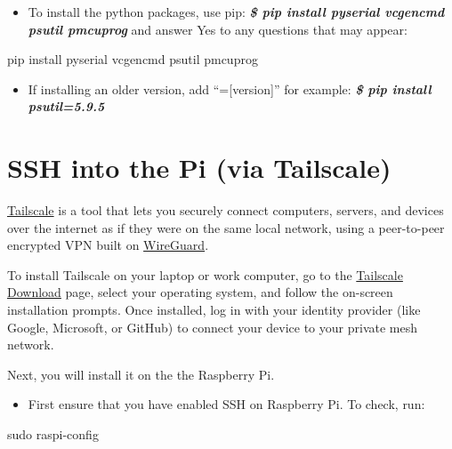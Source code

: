 \documentclass[
  letterpaper,
]{scrbook}
\newenvironment{Shaded}{\begin{snugshade}}{\end{snugshade}}
\newcommand{\ExtensionTok}[1]{\textcolor[rgb]{0.00,0.23,0.31}{#1}}
\newcommand{\FunctionTok}[1]{\textcolor[rgb]{0.28,0.35,0.67}{#1}}
\newcommand{\NormalTok}[1]{\textcolor[rgb]{0.00,0.23,0.31}{#1}}
\providecommand{\tightlist}{%
  \setlength{\itemsep}{0pt}\setlength{\parskip}{0pt}}
\begin{document}
\begin{itemize}
\tightlist
\item
  To install the python packages, use pip: \textbf{\emph{\$ pip install
  pyserial vcgencmd psutil pmcuprog}} and answer Yes to any questions
  that may appear:
\end{itemize}

\begin{Shaded}
\begin{Highlighting}[]
\ExtensionTok{pip}\NormalTok{ install pyserial vcgencmd psutil pmcuprog}
\end{Highlighting}
\end{Shaded}

\begin{itemize}
\tightlist
\item
  If installing an older version, add ``={[}version{]}'' for example:
  \textbf{\emph{\$ pip install psutil=5.9.5}}
\end{itemize}

\section{SSH into the Pi (via
Tailscale)}\label{ssh-into-the-pi-via-tailscale}

\href{https://tailscale.com/}{Tailscale} is a tool that lets you
securely connect computers, servers, and devices over the internet as if
they were on the same local network, using a peer-to-peer encrypted VPN
built on \href{https://www.wireguard.com/}{WireGuard}.

To install Tailscale on your laptop or work computer, go to the
\href{https://tailscale.com/download}{Tailscale Download} page, select
your operating system, and follow the on-screen installation prompts.
Once installed, log in with your identity provider (like Google,
Microsoft, or GitHub) to connect your device to your private mesh
network.

Next, you will install it on the the Raspberry Pi.

\begin{itemize}
\tightlist
\item
  First ensure that you have enabled SSH on Raspberry Pi. To check, run:
\end{itemize}

\begin{Shaded}
\begin{Highlighting}[]
\FunctionTok{sudo}\NormalTok{ raspi{-}config}
\end{Highlighting}
\end{Shaded}
\end{document}
